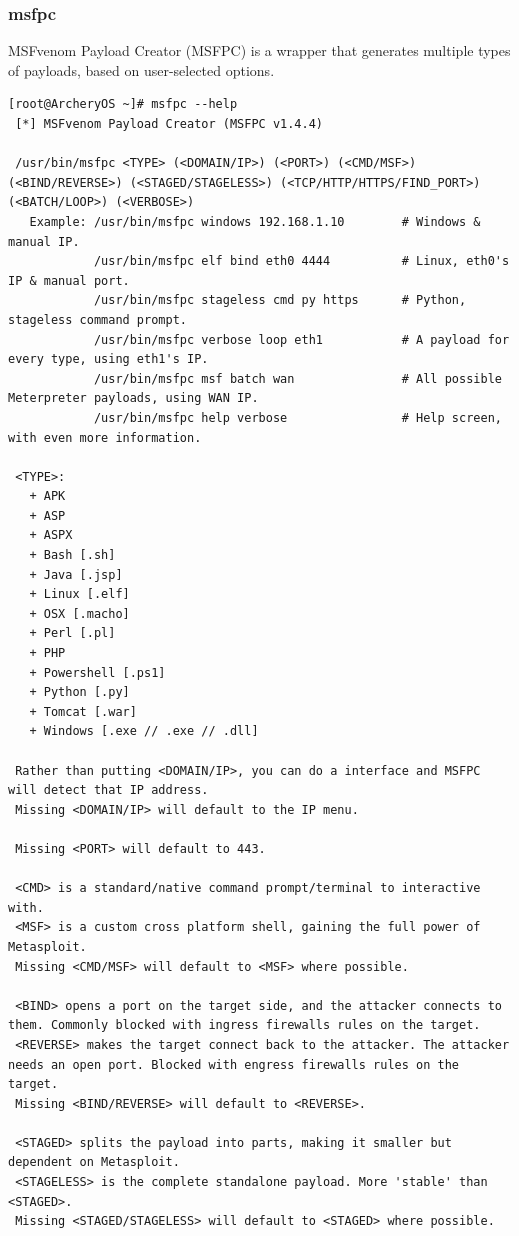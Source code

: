 \documentclass{article}
\begin{document}
\subsubsection{msfpc}
MSFvenom Payload Creator (MSFPC) is a wrapper that generates multiple types of payloads, based on user-selected options.
\begin{lstlisting}
[root@ArcheryOS ~]# msfpc --help
 [*] MSFvenom Payload Creator (MSFPC v1.4.4)

 /usr/bin/msfpc <TYPE> (<DOMAIN/IP>) (<PORT>) (<CMD/MSF>) (<BIND/REVERSE>) (<STAGED/STAGELESS>) (<TCP/HTTP/HTTPS/FIND_PORT>) (<BATCH/LOOP>) (<VERBOSE>)
   Example: /usr/bin/msfpc windows 192.168.1.10        # Windows & manual IP.
            /usr/bin/msfpc elf bind eth0 4444          # Linux, eth0's IP & manual port.
            /usr/bin/msfpc stageless cmd py https      # Python, stageless command prompt.
            /usr/bin/msfpc verbose loop eth1           # A payload for every type, using eth1's IP.
            /usr/bin/msfpc msf batch wan               # All possible Meterpreter payloads, using WAN IP.
            /usr/bin/msfpc help verbose                # Help screen, with even more information.

 <TYPE>:
   + APK
   + ASP
   + ASPX
   + Bash [.sh]
   + Java [.jsp]
   + Linux [.elf]
   + OSX [.macho]
   + Perl [.pl]
   + PHP
   + Powershell [.ps1]
   + Python [.py]
   + Tomcat [.war]
   + Windows [.exe // .exe // .dll]

 Rather than putting <DOMAIN/IP>, you can do a interface and MSFPC will detect that IP address.
 Missing <DOMAIN/IP> will default to the IP menu.

 Missing <PORT> will default to 443.

 <CMD> is a standard/native command prompt/terminal to interactive with.
 <MSF> is a custom cross platform shell, gaining the full power of Metasploit.
 Missing <CMD/MSF> will default to <MSF> where possible.

 <BIND> opens a port on the target side, and the attacker connects to them. Commonly blocked with ingress firewalls rules on the target.
 <REVERSE> makes the target connect back to the attacker. The attacker needs an open port. Blocked with engress firewalls rules on the target.
 Missing <BIND/REVERSE> will default to <REVERSE>.

 <STAGED> splits the payload into parts, making it smaller but dependent on Metasploit.
 <STAGELESS> is the complete standalone payload. More 'stable' than <STAGED>.
 Missing <STAGED/STAGELESS> will default to <STAGED> where possible.


\end{lstlisting}
\end{document}
